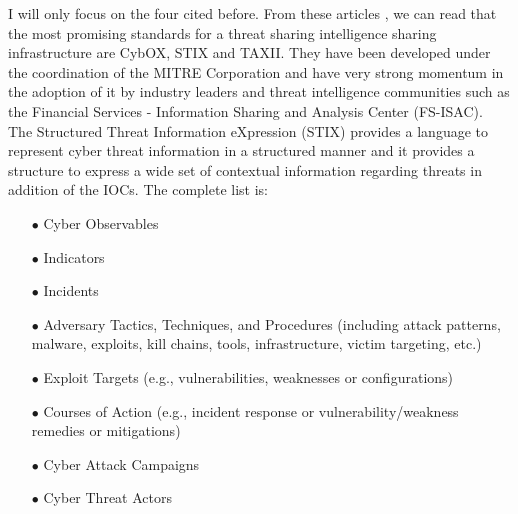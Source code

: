 \documentclass{eplmastersthesis}
\begin{document}
I will only focus on the four cited before. From these articles \cite{fransen2015cyber, sauerwein2017threat}, we can read that the most promising standards for a threat sharing intelligence sharing infrastructure are CybOX, STIX and TAXII. They have been developed under the coordination of the MITRE Corporation and have very strong momentum in the adoption of it by industry leaders and threat intelligence communities such as the Financial Services - Information Sharing and Analysis Center (FS-ISAC).\\
The  Structured Threat Information eXpression (STIX) \cite{barnum2012standardizing} provides a language to represent cyber threat information in a structured manner and it provides a structure to express a wide set of contextual information regarding threats in addition of the IOCs. The complete list is:

\begin{itemize}
\item[$\bullet$] Cyber Observables
\item[$\bullet$] Indicators
\item[$\bullet$] Incidents
\item[$\bullet$] Adversary Tactics, Techniques, and Procedures (including attack patterns, malware, exploits, kill
chains, tools, infrastructure, victim targeting, etc.)
\item[$\bullet$] Exploit Targets (e.g., vulnerabilities, weaknesses or configurations)
\item[$\bullet$] Courses of Action (e.g., incident response or vulnerability/weakness remedies or mitigations)
\item[$\bullet$] Cyber Attack Campaigns
\item[$\bullet$] Cyber Threat Actors
\end{itemize}
\end{document}
